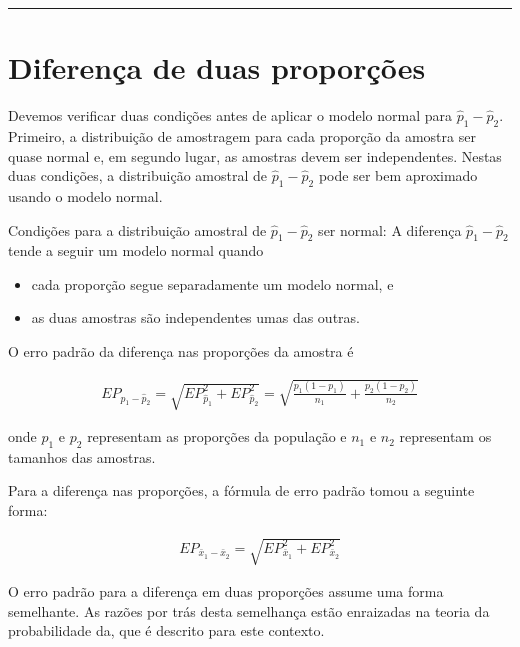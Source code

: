 \documentclass[
]{book}
\theoremstyle{definition}
\theoremstyle{definition}
\theoremstyle{definition}
\theoremstyle{definition}
\theoremstyle{remark}
\begin{document}
\begin{center}\rule{0.5\linewidth}{0.5pt}\end{center}

\hypertarget{twoProportionsDifference}{%
\section{Diferença de duas proporções}\label{twoProportionsDifference}}

Devemos verificar duas condições antes de aplicar o modelo normal para \(\hat{p}_1 - \hat{p}_2\). Primeiro, a distribuição de amostragem para cada proporção da amostra ser quase normal e, em segundo lugar, as amostras devem ser independentes. Nestas duas condições, a distribuição amostral de \(\hat{p}_1 - \hat{p}_2\) pode ser bem aproximado usando o modelo normal.

Condições para a distribuição amostral de \(\hat{p}_1 - \hat{p}_2\) ser normal: A diferença \(\hat{p}_1 - \hat{p}_2\) tende a seguir um modelo normal quando

\begin{itemize}
\item
  cada proporção segue separadamente um modelo normal, e
\item
  as duas amostras são independentes umas das outras.
\end{itemize}

O erro padrão da diferença nas proporções da amostra é

\begin{eqnarray}
EP_{\hat{p}_1 - \hat{p}_2}
    = \sqrt{EP_{\hat{p}_1}^2 + EP_{\hat{p}_2}^2}
    = \sqrt{\frac{p_1(1-p_1)}{n_1} + \frac{p_2(1-p_2)}{n_2}}
\label{eq:seForDiffOfProp}
\end{eqnarray}

onde \(p_1\) e \(p_2\) representam as proporções da população e \(n_1\) e \(n_2\) representam os tamanhos das amostras.

Para a diferença nas proporções, a fórmula de erro padrão tomou a seguinte forma:

\begin{eqnarray*}
EP_{\bar{x}_{1} - \bar{x}_{2}} = \sqrt{EP_{\bar{x}_1}^2 + EP_{\bar{x}_2}^2}
\end{eqnarray*}

O erro padrão para a diferença em duas proporções assume uma forma semelhante. As razões por trás desta semelhança estão enraizadas na teoria da probabilidade da, que é descrito para este contexto.
\end{document}
